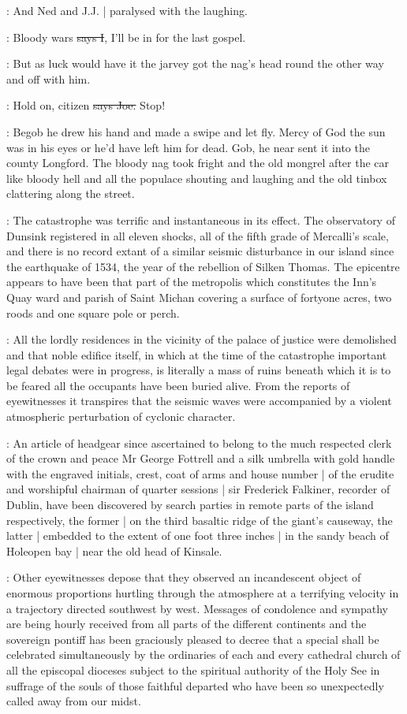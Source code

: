 \Nq:
And Ned and J.J. |
paralysed with the laughing.

:
Bloody wars
\sout{says I},
I'll be in for the last gospel.

\Nq:
But as luck would have it
the jarvey got the nag's head round the
other way and off with him.

\joe:
Hold on,
citizen
\sout{says Joe.}
Stop!

\Nq:
Begob he drew his hand and made a swipe and let fly.
Mercy of God the sun was in his eyes or he'd have left him for dead.
Gob,
he near sent it into the county Longford.
The bloody nag took fright
and the old mongrel
after the car like bloody hell and all the populace shouting and laughing
and the old tinbox clattering along the street.

:
The catastrophe was terrific and instantaneous in its effect.
The observatory of Dunsink registered in all eleven shocks,
all of the fifth grade of Mercalli's scale,
and there is no record extant of a similar
seismic disturbance in our island since the earthquake of 1534,
the year of the rebellion of Silken Thomas.
The epicentre appears to have
been that part of the metropolis which constitutes the Inn's Quay
ward and parish of Saint Michan covering a surface of fortyone acres,
two roods and one square pole or perch.

:
All the lordly residences in
the vicinity of the palace of justice were demolished and that noble
edifice itself,
in which at the time of the catastrophe important
legal debates were in progress,
is literally a mass of ruins beneath
which it is to be feared all the occupants have been buried alive.
From the reports of eyewitnesses it transpires that the seismic waves
were accompanied
by a violent atmospheric perturbation of cyclonic character.

:
An article of headgear since ascertained to belong to the much
respected clerk of the crown and peace Mr George Fottrell and a silk
umbrella with gold handle with the engraved initials,
crest,
coat of arms
and house number |
of the erudite and worshipful chairman of quarter sessions |
sir Frederick Falkiner,
recorder of Dublin,
have been discovered by search parties in remote parts of the island respectively,
the former |
on the third basaltic ridge of the giant's causeway,
the latter |
embedded to the extent of one foot three inches |
in the sandy beach of Holeopen bay |
near the old head of Kinsale.

:
Other eyewitnesses depose that they observed an incandescent object of enormous proportions
hurtling through
the atmosphere at a terrifying velocity in a trajectory directed southwest by west.
Messages of condolence and sympathy are being
hourly received from all parts of the different continents and the
sovereign pontiff has been graciously pleased to decree that a
special  shall be celebrated simultaneously by
the ordinaries of each and every cathedral church of all the episcopal
dioceses subject to the spiritual authority of the Holy See in suffrage of
the souls of those faithful departed who have been so unexpectedly called
away from our midst.

